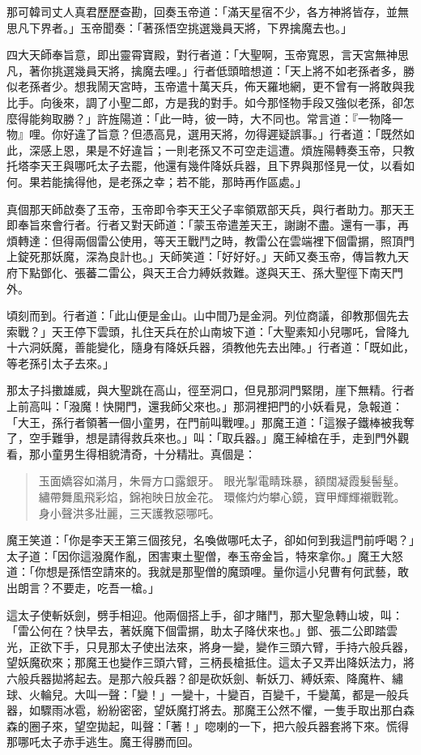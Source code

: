 那可韓司丈人真君歷歷查勘，回奏玉帝道：「滿天星宿不少，各方神將皆存，並無思凡下界者。」玉帝聞奏：「著孫悟空挑選幾員天將，下界擒魔去也。」

四大天師奉旨意，即出靈霄寶殿，對行者道：「大聖啊，玉帝寬恩，言天宮無神思凡，著你挑選幾員天將，擒魔去哩。」行者低頭暗想道：「天上將不如老孫者多，勝似老孫者少。想我鬧天宮時，玉帝遣十萬天兵，佈天羅地網，更不曾有一將敢與我比手。向後來，調了小聖二郎，方是我的對手。如今那怪物手段又強似老孫，卻怎麼得能夠取勝？」許旌陽道：「此一時，彼一時，大不同也。常言道：『一物降一物』哩。你好違了旨意？但憑高見，選用天將，勿得遲疑誤事。」行者道：「既然如此，深感上恩，果是不好違旨；一則老孫又不可空走這遭。煩旌陽轉奏玉帝，只教托塔李天王與哪吒太子去罷，他還有幾件降妖兵器，且下界與那怪見一仗，以看如何。果若能擒得他，是老孫之幸；若不能，那時再作區處。」

真個那天師啟奏了玉帝，玉帝即令李天王父子率領眾部天兵，與行者助力。那天王即奉旨來會行者。行者又對天師道：「蒙玉帝遣差天王，謝謝不盡。還有一事，再煩轉達：但得兩個雷公使用，等天王戰鬥之時，教雷公在雲端裡下個雷㨝，照頂門上錠死那妖魔，深為良計也。」天師笑道：「好好好。」天師又奏玉帝，傳旨教九天府下點鄧化、張蕃二雷公，與天王合力縛妖救難。遂與天王、孫大聖徑下南天門外。

頃刻而到。行者道：「此山便是金山。山中間乃是金洞。列位商議，卻教那個先去索戰？」天王停下雲頭，扎住天兵在於山南坡下道：「大聖素知小兒哪吒，曾降九十六洞妖魔，善能變化，隨身有降妖兵器，須教他先去出陣。」行者道：「既如此，等老孫引太子去來。」

那太子抖擻雄威，與大聖跳在高山，徑至洞口，但見那洞門緊閉，崖下無精。行者上前高叫：「潑魔！快開門，還我師父來也。」那洞裡把門的小妖看見，急報道：「大王，孫行者領著一個小童男，在門前叫戰哩。」那魔王道：「這猴子鐵棒被我奪了，空手難爭，想是請得救兵來也。」叫：「取兵器。」魔王綽槍在手，走到門外觀看，那小童男生得相貌清奇，十分精壯。真個是：
\begin{quote}
玉面嬌容如滿月，朱脣方口露銀牙。
眼光掣電睛珠暴，額闊凝霞髮髻髽。
繡帶舞風飛彩焰，錦袍映日放金花。
環絛灼灼攀心鏡，寶甲輝輝襯戰靴。
身小聲洪多壯麗，三天護教惡哪吒。
\end{quote}

魔王笑道：「你是李天王第三個孩兒，名喚做哪吒太子，卻如何到我這門前呼喝？」太子道：「因你這潑魔作亂，困害東土聖僧，奉玉帝金旨，特來拿你。」魔王大怒道：「你想是孫悟空請來的。我就是那聖僧的魔頭哩。量你這小兒曹有何武藝，敢出朗言？不要走，吃吾一槍。」

這太子使斬妖劍，劈手相迎。他兩個搭上手，卻才賭鬥，那大聖急轉山坡，叫：「雷公何在？快早去，著妖魔下個雷㨝，助太子降伏來也。」鄧、張二公即踏雲光，正欲下手，只見那太子使出法來，將身一變，變作三頭六臂，手持六般兵器，望妖魔砍來；那魔王也變作三頭六臂，三柄長槍抵住。這太子又弄出降妖法力，將六般兵器拋將起去。是那六般兵器？卻是砍妖劍、斬妖刀、縛妖索、降魔杵、繡球、火輪兒。大叫一聲：「變！」一變十，十變百，百變千，千變萬，都是一般兵器，如驟雨冰雹，紛紛密密，望妖魔打將去。那魔王公然不懼，一隻手取出那白森森的圈子來，望空拋起，叫聲：「著！」唿喇的一下，把六般兵器套將下來。慌得那哪吒太子赤手逃生。魔王得勝而回。

